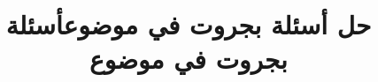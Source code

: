 \documentclass[14pt]{extarticle}
\title{حل أسئلة بجروت في موضوع}
\title{أسئلة بجروت في موضوع}
\begin{document}

\maketitle
\renewcommand{\contentsname}{جدول المحتويات}
\tableofcontents
\clearpage






\end{document}
